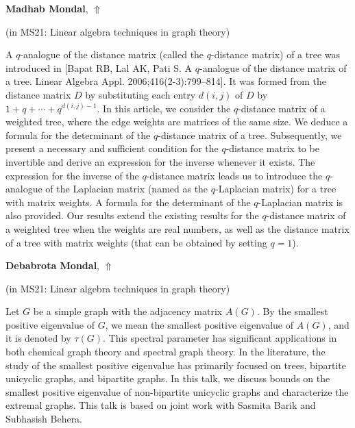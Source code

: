 \documentclass[ILAS2025-program.tex]{subfiles}
\begin{document}
\hypertarget{down0172}{}\begin{ilasabstract}
    
\textbf{Madhab Mondal},  \hfill \hyperlink{up0172}{$\Uparrow$}
    
    
(in {\color{mstitle}MS21: Linear algebra techniques in graph theory})
        
\mtskip
    A $q$-analogue of the distance matrix (called the $q$-distance matrix) of a tree was introduced in [Bapat RB, Lal AK, Pati S. A $q$-analogue of the distance matrix of a tree. Linear Algebra Appl. 2006;416(2-3):799--814]. It was formed from the distance matrix $D$ by substituting each entry $d(i,j)$ of $D$ by $1+q+\cdots+q^{d(i,j)-1}$. In this article, we consider the $q$-distance matrix of a weighted tree, where the edge weights are matrices of the same size. We deduce a formula for the determinant of the $q$-distance matrix of a tree. Subsequently, we present a necessary and sufficient condition for the $q$-distance matrix to be invertible and derive an expression for the inverse whenever it exists. The expression for the inverse of the $q$-distance matrix leads us to introduce the $q$-analogue of the Laplacian matrix (named as the $q$-Laplacian matrix) for a tree with matrix weights. A formula for the determinant of the $q$-Laplacian matrix is also provided. Our results extend the existing results for the $q$-distance matrix of a weighted tree when the weights are real numbers, as well as the distance matrix of a tree with matrix weights (that can be obtained by setting $q=1$).
\end{ilasabstract}
    

\hypertarget{down0381}{}\begin{ilasabstract}
    
\textbf{Debabrota Mondal},  \hfill \hyperlink{up0381}{$\Uparrow$}
    
    
(in {\color{mstitle}MS21: Linear algebra techniques in graph theory})
        
\mtskip
    Let $G$ be a simple graph with the adjacency matrix $A(G)$. By the smallest positive eigenvalue of $G$, we mean the smallest positive eigenvalue of $A(G)$, and it is denoted by $\tau(G)$. This spectral parameter has significant applications in both chemical graph theory and spectral graph theory. In the literature, the study of the smallest positive eigenvalue has primarily focused on trees, bipartite unicyclic graphs, and bipartite graphs. In this talk, we discuss bounds on the smallest positive eigenvalue of non-bipartite unicyclic graphs and characterize the extremal graphs. This talk is based on joint work with Sasmita Barik and Subhasish Behera.
\end{ilasabstract}
    
\end{document}
